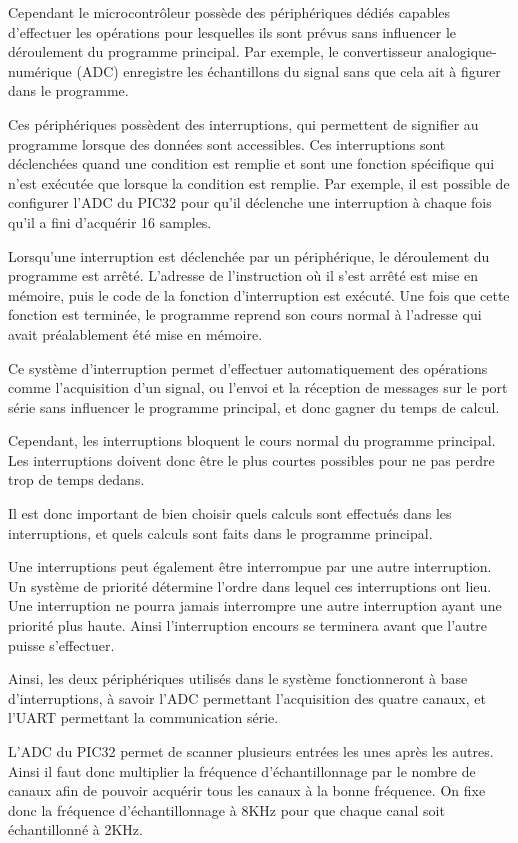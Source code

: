 \documentclass[letterpaper, twoside, 12pt, memoire, creativecommons, hyperref]{thETS}
\begin{document}
Cependant le microcontrôleur possède des périphériques dédiés capables d'effectuer les opérations pour lesquelles ils sont prévus sans influencer le déroulement du programme principal. Par exemple, le convertisseur analogique-numérique (ADC) enregistre les échantillons du signal sans que cela ait à figurer dans le programme. 

Ces périphériques possèdent des interruptions, qui permettent de signifier au programme lorsque des données sont accessibles. Ces interruptions sont déclenchées quand une condition est remplie et sont une fonction spécifique qui n'est exécutée que lorsque la condition est remplie. Par exemple, il est possible de configurer l'ADC du PIC32 pour qu'il déclenche une interruption à chaque fois qu'il a fini d'acquérir 16 samples. 

Lorsqu'une interruption est déclenchée par un périphérique, le déroulement du programme est arrêté. L'adresse de l'instruction où il s'est arrêté est mise en mémoire, puis le code de la fonction d'interruption est exécuté. Une fois que cette fonction est terminée, le programme reprend son cours normal à l'adresse qui avait préalablement été mise en mémoire. 

Ce système d'interruption permet d'effectuer automatiquement des opérations comme l'acquisition d'un signal, ou l'envoi et la réception de messages sur le port série sans influencer le programme principal, et donc gagner du temps de calcul. 

Cependant, les interruptions bloquent le cours normal du programme principal. Les interruptions doivent donc être le plus courtes possibles pour ne pas perdre trop de temps dedans. 

Il est donc important de bien choisir quels calculs sont effectués dans les interruptions, et quels calculs sont faits dans le programme principal. 

Une interruptions peut également être interrompue par une autre interruption. Un système de priorité détermine l'ordre dans lequel ces interruptions ont lieu. Une interruption ne pourra jamais interrompre une autre interruption ayant une priorité plus haute. Ainsi l'interruption encours se terminera avant que l'autre puisse s'effectuer. 

Ainsi, les deux périphériques utilisés dans le système fonctionneront à base d'interruptions, à savoir l'ADC permettant l'acquisition des quatre canaux, et l'UART permettant la communication série. 

L'ADC du PIC32 permet de scanner plusieurs entrées les unes après les autres. Ainsi il faut donc multiplier la fréquence d'échantillonnage par le nombre de canaux afin de pouvoir acquérir tous les canaux à la bonne fréquence. On fixe donc la fréquence d'échantillonnage à 8KHz pour que chaque canal soit échantillonné à 2KHz. 
\end{document}
